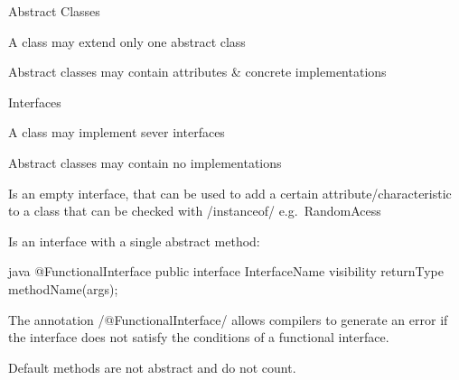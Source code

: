 \begin{notebox}\nospacing
  \begin{itemizenosep}
      \item Abstract Classes
    \begin{itemizenosep}
        \item A class may extend only one abstract class
        \item Abstract classes may contain attributes \& concrete implementations
    \end{itemizenosep}
      \item Interfaces
    \begin{itemizenosep}
        \item A class may implement sever interfaces
        \item Abstract classes may contain no implementations 
    \end{itemizenosep}
  \end{itemizenosep}
\end{notebox}
\begin{defnbox}\nospacing
  \begin{defn}\label{defn:markerInerface}
    Is an empty interface, that can be used to add a certain
    attribute/characteristic to a class that can be checked with
    \javainline/instanceof/ e.g.\ RandomAcess 
  \end{defn}
\end{defnbox}
\begin{defnbox}\nospacing
  \begin{defn}\label{defn:functionalInterface}
    Is an interface with a single abstract method:
    \begin{mintlinebox}{java}
      @FunctionalInterface
      public interface InterfaceName{
        visibility returnType methodName(args);
      }
    \end{mintlinebox}
  \end{defn}
\end{defnbox}
\begin{notebox}[Notes]\nospacing
  \begin{itemizenosep}
      \item The annotation \javainline/@FunctionalInterface/ allows compilers to generate an
  error if the interface does not satisfy the conditions of a functional
  interface.
    \item Default methods are not abstract and do not count.
  \end{itemizenosep}
\end{notebox}
\begin{sectionbox}\nospacing
  
\end{sectionbox}
